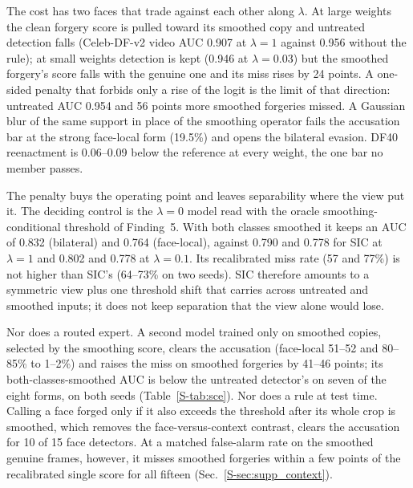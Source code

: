 \documentclass[conference]{IEEEtran}
\begin{document}
The cost has two faces that trade against each other along $\lambda$. At large weights the clean forgery score is pulled
toward its smoothed copy and untreated detection falls (Celeb-DF-v2 video AUC 0.907 at $\lambda=1$ against 0.956 without
the rule); at small weights detection is kept (0.946 at $\lambda=0.03$) but the smoothed forgery's score falls with the
genuine one and its miss rises by 24 points. A one-sided penalty that forbids only a rise of the logit is the limit of that
direction: untreated AUC 0.954 and 56 points more smoothed forgeries missed. A Gaussian blur of the same support in place of
the smoothing operator fails the accusation bar at the strong face-local form (19.5\%) and opens the bilateral evasion. DF40
reenactment is 0.06--0.09 below the reference at every weight, the one bar no member passes.

The penalty buys the operating point and leaves separability where the view put it. The deciding control is the $\lambda=0$ model read with
the oracle smoothing-conditional threshold of Finding~5. With both classes smoothed it keeps an AUC of 0.832 (bilateral) and
0.764 (face-local), against 0.790 and 0.778 for SIC at $\lambda=1$ and 0.802 and 0.778 at $\lambda=0.1$. Its
recalibrated miss rate (57 and 77\%) is not higher than SIC's (64--73\% on two seeds).
SIC therefore amounts to a symmetric view plus one threshold shift that carries across untreated and smoothed
inputs; it does not keep separation that the view alone would lose.

Nor does a routed expert. A second model trained only on
smoothed copies, selected by the smoothing score, clears the accusation (face-local 51--52 and 80--85\% to 1--2\%) and raises
the miss on smoothed forgeries by 41--46 points; its both-classes-smoothed AUC is below the untreated detector's on seven
of the eight forms, on both seeds (Table~\ref{S-tab:sce}).
Nor does a rule at test time. Calling a face forged only if it also exceeds the threshold after its whole crop is smoothed,
which removes the face-versus-context contrast, clears the accusation for 10 of 15 face detectors. At a matched false-alarm
rate on the smoothed genuine frames, however, it misses smoothed forgeries within a few points of the recalibrated single
score for all fifteen (Sec.~\ref{S-sec:supp_context}).
\end{document}
